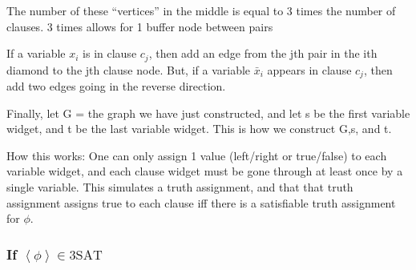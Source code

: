 

The number of these ``vertices'' in the middle is equal to 3 times the number of clauses. 3 times allows for 1 buffer node between pairs 

If a variable $x_i$ is in clause $c_j$, then add an edge from the jth pair in the ith diamond to the jth clause node. But, if a variable $\bar x_i$ appears in clause $c_j$, then add two edges going in the reverse direction.

Finally, let G = the graph we have just constructed, and let s be the first variable widget, and t be the last variable widget. This is how we construct G,s, and t. 

How this works: One can only assign 1 value (left/right or true/false) to each variable widget, and each clause widget must be gone through at least once by a single variable. This simulates a truth assignment, and that that truth assignment assigns true to each clause iff there is a satisfiable truth assignment for $\phi$. 

\subsubsection{If $\left<\phi\right>\in\text{3SAT}$}

